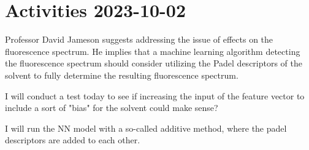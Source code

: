 \documentclass{article}
\begin{document}
\section{Activities 2023-10-02}
Professor David Jameson suggests addressing the issue of effects on the fluorescence spectrum. He implies that a machine learning algorithm detecting the fluorescence spectrum should consider utilizing the Padel descriptors of the solvent to fully determine the resulting fluorescence spectrum.

I will conduct a test today to see if increasing the input of the feature vector to include a sort of "bias" for the solvent could make sense?

I will run the NN model with a so-called additive method, where the padel descriptors are added to each other.
\end{document}

